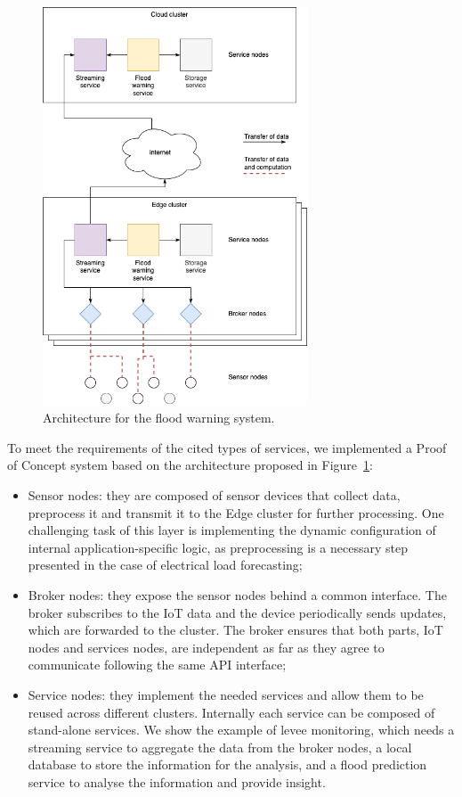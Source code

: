 \begin{figure}[ht]
\centering
\includegraphics[width=0.7\textwidth]{figures/architecture-levee2}
\caption{Architecture for the flood warning system.}
\label{fig:architecture-levee}
\end{figure}

To meet the requirements of the cited types of services, we implemented a Proof of Concept system based on the architecture proposed in Figure~\ref{fig:architecture-levee}:

\begin{itemize}
    \item Sensor nodes: they are composed of sensor devices that collect data, preprocess it and transmit it to the Edge cluster for further processing. One challenging task of this layer is implementing the dynamic configuration of internal application-specific logic, as preprocessing is a necessary step presented in the case of electrical load forecasting;
    \item Broker nodes: they expose the sensor nodes behind a common interface. The broker subscribes to the IoT data and the device periodically sends updates, which are forwarded to the cluster. The broker ensures that both parts, IoT nodes and services nodes, are independent as far as they agree to communicate following the same API interface;
    \item Service nodes: they implement the needed services and allow them to be reused across different clusters. Internally each service can be composed of stand-alone services. We show the example of levee monitoring, which needs a streaming service to aggregate the data from the broker nodes, a local database to store the information for the analysis, and a flood prediction service to analyse the information and provide insight. 
\end{itemize}

